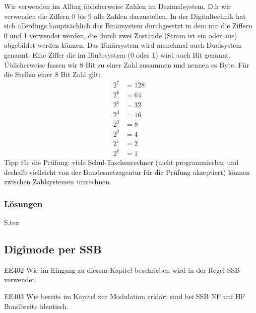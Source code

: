 \documentclass[10pt,a4paper,ngerman]{article}
\theoremstyle{definition}
\theoremstyle{plain}
\theoremstyle{mytheorem}
\theoremstyle{definition}
\newenvironment{ohmchapter}{}
{
  \subsubsection*{Lösungen}
  S\arabic{subsection}.tex}
}
\begin{document}
\begin{ohmchapter}
  Wir verwenden im Alltag üblicherweise Zahlen im Dezimalsystem. D.h wir verwenden die Ziffern 0 bis 9 alle Zahlen darzustellen. 
  In der Digitaltechnik hat sich allerdings hauptsächlich das Binärsystem durchgesetzt in dem nur die Ziffern 0 und 1 verwendet werden, die durch zwei Zustände (Strom ist ein oder aus) abgebildet werden können.  Das Binärsystem wird manchmal auch Dualsystem genannt.
   Eine Ziffer die im Binärsystem (0 oder 1) wird auch Bit genannt.
  Üblicherweise fassen wir 8 Bit zu einer Zahl zusammen und nennen es Byte.
  Für die Stellen einer 8 Bit Zahl gilt: 
  \begin{align*}
    2^7 &= 128 \\         
    2^6 &= 64 \\
    2^5 &= 32 \\  
    2^4 &= 16 \\         
    2^3 &= 8  \\
    2^2 &= 4 \\         
    2^1 &= 2  \\   
    2^0 &= 1  
  \end{align*}  
Tipp für die Prüfung: viele Schul-Taschenrechner (nicht programmierbar und deshalb vielleicht von der Bundesnetzagentur für die Prüfung akzeptiert) können zwischen Zahlsystemen umrechnen.
\end{ohmchapter}


\subsection{Digimode per SSB}

\begin{sol}{EE402}
  Wie im Eingang zu diesem Kapitel beschrieben wird in der Regel SSB verwendet.
\end{sol}


\begin{sol}{EE403}
Wie bereits im Kapitel zur Modulation erklärt sind bei SSB NF unf HF Bandbreite identisch.
\end{sol}
\end{document}
